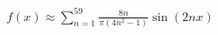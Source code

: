 \documentclass[preview]{standalone}
\begin{document}
\begin{align*}
f(x) \approx \sum_{n=1}^{59} \frac{8n}{\pi(4n^2-1)} \sin(2nx)
\end{align*}
\end{document}
